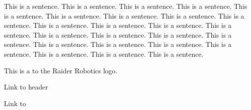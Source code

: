 

This is a sentence. This is a sentence. This is a sentence. This is a sentence. This is a sentence. This is a sentence. This is a sentence. This is a sentence. This is a sentence. This is a sentence. This is a sentence. This is a sentence. This is a sentence. This is a sentence. This is a sentence. This is a sentence. This is a sentence. This is a sentence. This is a sentence. This is a sentence. This is a sentence. This is a sentence. This is a sentence. This is a sentence. 

This is a \underline{} to the Raider Robotics logo.

\underline{}

Link to header \underline{}

Link to \underline{}

\underline{}
